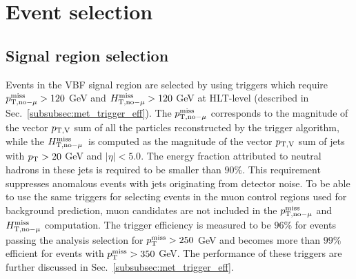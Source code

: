 \section{Event selection}
\label{sec:event_selection}

\newcommand\plotDir{DataMC/merged_2023-04-08_vbfhinv_full_analysis}

\subsection{Signal region selection}
\label{subsec:sr_vbf_selection}

Events in the VBF signal region are selected by using triggers which require
$p_{\textrm{T},\textrm{no}-\mu}^{\textrm{miss}} > 120$ GeV and $H_{\textrm{T},\textrm{no}-\mu}^{\textrm{miss}} > 120$ GeV at HLT-level (described in Sec.~\ref{subsubsec:met_trigger_eff}). 
The $p_{\textrm{T},\textrm{no}-\mu}^{\textrm{miss}}$ corresponds to the magnitude of the vector $p_{\mathrm{T},\mathrm{V}}$ 
sum of all the particles reconstructed by the trigger algorithm, 
while the $H_{\textrm{T},\textrm{no}-\mu}^{\textrm{miss}}$~is computed as the magnitude of the vector $p_{\mathrm{T},\mathrm{V}}$ sum of jets with $p_{\textrm{T}} > 20$ GeV and $|\eta| < 5.0$. 
The energy fraction attributed to neutral hadrons in these jets is required to be smaller than $90\%$. 
This requirement suppresses anomalous events with jets originating from detector noise. 
To be able to use the same triggers for selecting events in the muon control regions used for background prediction, 
muon candidates are not included in the $p_{\textrm{T},\textrm{no}-\mu}^{\textrm{miss}}$ and $H_{\textrm{T},\textrm{no}-\mu}^{\textrm{miss}}$ computation. 
The trigger efficiency is measured to be $96\%$ for events passing the analysis selection for $p_{\textrm{T}}^{\textrm{miss}} > 250$ GeV and 
becomes more than $99\%$ efficient for events with $p_{\textrm{T}}^{\textrm{miss}} > 350$ GeV. 
The performance of these triggers are further discussed in Sec.~\ref{subsubsec:met_trigger_eff}.

